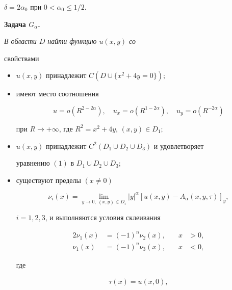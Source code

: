 $\delta=2\alpha_0$ при $0<\alpha_0\le 1/2$. 


\medskip 


 


{\bf Задача $G_\alpha$.} {\it В области $D$ найти функцию $u(x,y)$ со 


свойствами 


\begin{itemize} 


\item[1)] $u(x,y)$ принадлежит $C(D\cup\{x^2+4y=0\});$ 


\item[2)] имеют место соотношения 


\begin{equation} 


u=o(R^{2-2\alpha}),\quad u_x=o(R^{1-2\alpha}),\quad 


u_y=o(R^{-2\alpha}) 


\end{equation} 


при $R\to+\infty$, где $R^2=x^2+4y$, $(x,y)\in D_1;$ 


\item[3)] $u(x,y)$ принадлежит $C^2(D_1\cup D_2\cup D_3)$ и удовлетворяет 


уравнению $(1)$ в $D_1\cup D_2\cup D_3;$ 


\item[4)] существуют пределы $(x\ne0)$ 


\begin{equation} 


\nu_i(x)=\lim_{y\to0,\ (x,y)\in D_i}|y|^\alpha 


[u(x,y)-A_\alpha(x,y,\tau)]_y, 


\end{equation} 


$i=1,2,3$, и выполняются условия склеивания 


\begin{alignat}{2} 


\nu_1(x)&=(-1)^n \nu_2(x), &\quad x&>0,\\ 


\nu_1(x)&=(-1)^n\nu_3(x), &\quad x&<0, 


\end{alignat} 


где 


\begin{gather} 


\tau(x)=u(x,0),\\ 



\end{gather}
\end{itemize}}
